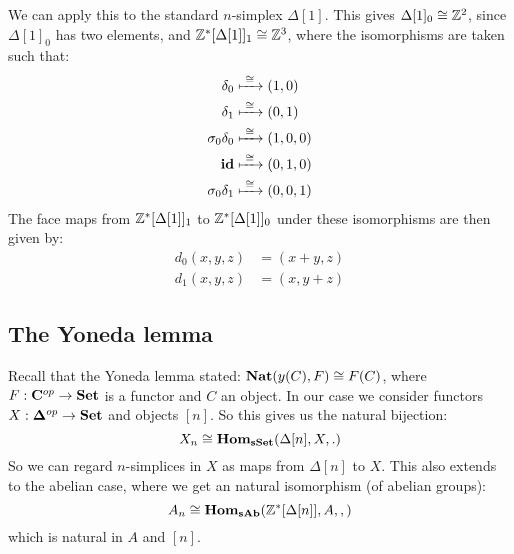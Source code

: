 \begin{example}
	We can apply this to the standard $n$-simplex $\Delta[1]$. This gives $\Delta[1]_0 \cong \mathbb{Z}^2$, since $\Delta[1]_0$ has two elements, and $\mathbb{Z}^\ast[\Delta[1]]_1 \cong \mathbb{Z}^3$, where the isomorphisms are taken such that:
	\begin{align*}
		\delta_0         &\xmapsto{\,\,{\cong}\,\,} (1, 0) \\
		\delta_1         &\xmapsto{\,\,{\cong}\,\,} (0, 1) \\
		\sigma_0\delta_0 &\xmapsto{\,\,{\cong}\,\,} (1, 0, 0) \\
		\mathbf{id}              &\xmapsto{\,\,{\cong}\,\,} (0, 1, 0) \\
		\sigma_0\delta_1 &\xmapsto{\,\,{\cong}\,\,} (0, 0, 1)
	\end{align*}
	The face maps from $\mathbb{Z}^\ast[\Delta[1]]_1$ to $\mathbb{Z}^\ast[\Delta[1]]_0$ under these isomorphisms are then given by:
	\begin{align*}
		d_0(x, y, z) &= (x+y, z) \\
		d_1(x, y, z) &= (x, y+z)
	\end{align*}
\end{example}

\subsection{The Yoneda lemma}
Recall that the Yoneda lemma stated: $\mathbf{Nat}(y(C), F) \cong F(C)$, where $F:\mathbf{C}^{op} \to \mathbf{Set}$ is a functor and $C$ an object. In our case we consider functors $X: \mathbf{\Delta}^{op} \to \mathbf{Set}$ and objects $[n]$. So this gives us the natural bijection:
$$ X_n \cong \mathbf{Hom}_{\mathbf{sSet}}(\Delta[n], X, .) $$
So we can regard $n$-simplices in $X$ as maps from $\Delta[n]$ to $X$. This also extends to the abelian case, where we get an natural isomorphism (of abelian groups):
$$ A_n \cong \mathbf{Hom}_{\mathbf{sAb}}(\mathbb{Z}^\ast[\Delta[n]], A, ,) $$
which is natural in $A$ and $[n]$.

